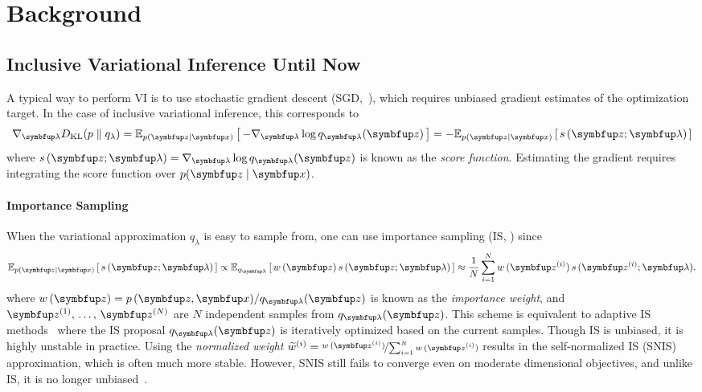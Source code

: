
\section{Background}
\subsection{Inclusive Variational Inference Until Now}\label{section:ivi_previous}
A typical way to perform VI is to use stochastic gradient descent (SGD,~\citealt{robbins_stochastic_1951, bottou_online_1999}), which requires unbiased gradient estimates of the optimization target.
In the case of inclusive variational inference, this corresponds to 
%
\begin{align}
  \nabla_{\vlambda} \DKL{p}{q_{\lambda}}
  = \Esub{p(\vz\mid\vx)}{ - \nabla_{\vlambda} \log q_{\vlambda}(\vz) }
  = - \Esub{p(\vz\mid\vx)}{ s\,(\vz; \vlambda) }
\end{align}
where \(s\,(\vz; \vlambda) = \nabla_{\vlambda} \log q_{\vlambda}(\vz)\) is known as the \textit{score function}.
Estimating the gradient requires integrating the score function over \(p(\vz\mid\vx)\).

\paragraph{Importance Sampling}
When the variational approximation \(q_{\lambda}\) is easy to sample from, one can use importance sampling (IS, \citealt{robert_monte_2004, mcbook}) since 
\begin{align}
  \Esub{p(\vz\mid\vx)}{ s\,(\vz; \vlambda) }
  \propto \Esub{q_{\vlambda}}{ w\,(\vz) \, s\,(\vz; \vlambda) }
  \approx \frac{1}{N} \sum^{N}_{i=1} w\,(\vz^{(i)}) \, s\,(\vz^{(i)}; \vlambda) .
\end{align}
where \(w\,(\vz) = p\,(\vz,\vx) / q_{\vlambda}(\vz)\) is known as the \textit{importance weight}, and \(\vz^{(1)},\, \ldots,\, \vz^{(N)}\) are \(N\) independent samples from \(q_{\vlambda}(\vz)\).
This scheme is equivalent to adaptive IS methods~\citep{cappe_adaptive_2008, bugallo_adaptive_2017} where the IS proposal \(q_{\vlambda}(\vz)\) is iteratively optimized based on the current samples.
Though IS is unbiased, it is highly unstable in practice.
Using the \textit{normalized weight} \(\widetilde{w}^{(i)} = \nicefrac{w\,(\vz^{(i)})}{\sum_{i=1}^N w\,(\vz^{(i)}) }\) results in the self-normalized IS (SNIS) approximation, which is often much more stable.
However, SNIS still fails to converge even on moderate dimensional objectives, and unlike IS, it is no longer unbiased~\citep{robert_monte_2004, mcbook}.

